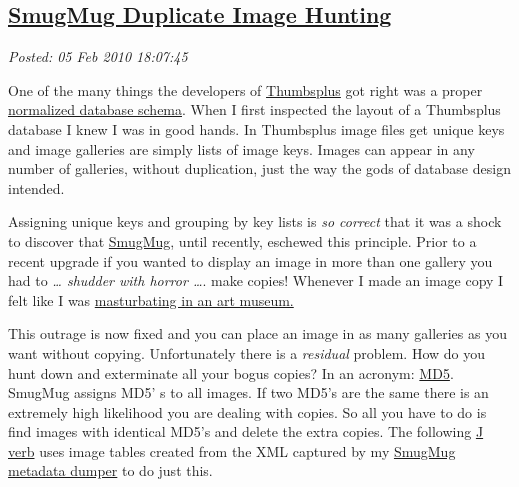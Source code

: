 %

\subsection*{\href{http://bakerjd99.wordpress.com/2010/02/05/smugmug-duplicate-image-hunting/}{SmugMug Duplicate Image Hunting}}


\noindent\emph{Posted: 05 Feb 2010 18:07:45}
\vspace{6pt}

One of the many things the developers of
\href{http://www.cerious.com/}{Thumbsplus} got right was a proper
\href{http://en.wikipedia.org/wiki/Database\_normalization}{normalized
database schema}. When I first inspected the layout of a Thumbsplus
database I knew I was in good hands. In Thumbsplus image files get
unique keys and image galleries are simply lists of image keys. Images
can appear in any number of galleries, without duplication, just the way
the gods of database design intended.

Assigning unique keys and grouping by key lists is \emph{so correct}
that it was a shock to discover that
\href{http://www.smugmug.com/}{SmugMug}, until recently, eschewed this
principle. Prior to a recent upgrade if you wanted to display an image
in more than one gallery you had to \emph{\ldots{} shudder with horror
\ldots{}}. make copies! Whenever I made an image copy I felt like I was
\href{http://www.goarticles.com/cgi-bin/showa.cgi?C=1331827}{masturbating
in an art museum.}

This outrage is now fixed and you can place an image in as many
galleries as you want without copying. Unfortunately there is a
\emph{residual} problem. How do you hunt down and exterminate all your
bogus copies? In an acronym:
\href{http://www.fastsum.com/support/md5-checksum-utility-faq/md5-hash.php}{MD5}.
SmugMug assigns MD5' s to all images. If two MD5's are the same there is
an extremely high likelihood you are dealing with copies. So all you
have to do is find images with identical MD5's and delete the extra
copies. The following \href{http://www.jsoftware.com/}{J verb} uses image
tables created from the XML captured by my
\href{http://bakerjd99.wordpress.com/2010/02/03/command-line-c-smugmug-api-metadata-download/}{SmugMug
metadata dumper} to do just this.


